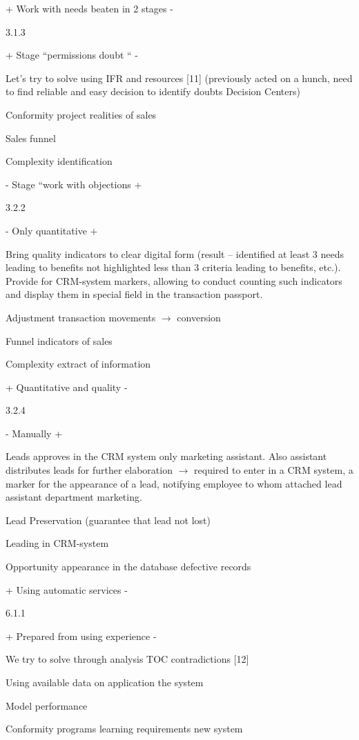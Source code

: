 \documentclass[11pt,a4paper]{book}
\begin{document}
+ Work with needs beaten in 2 stages -

3.1.3

+ Stage “permissions doubt “ -

Let's try to solve using IFR and resources [11] (previously acted on a hunch,
need to find reliable and easy decision to identify doubts Decision Centers)

Conformity project realities of sales

Sales funnel

Complexity identification

- Stage “work with objections +

3.2.2

- Only quantitative +

Bring quality indicators to clear digital form (result -- identified at least
3 needs leading to benefits not highlighted less than 3 criteria leading to
benefits, etc.). Provide for CRM-system markers, allowing to conduct counting
such indicators and display them in special field in the transaction passport.

Adjustment transaction movements $\to$ conversion

Funnel indicators of sales

Complexity extract of information

+ Quantitative and quality -

3.2.4

- Manually +

Leads approves in the CRM system only marketing assistant. Also assistant
distributes leads for further elaboration $\to$ required to enter in a CRM
system, a marker for the appearance of a lead, notifying employee to whom
attached lead assistant department marketing.

Lead Preservation (guarantee that lead not lost)

Leading in CRM-system

Opportunity appearance in the database defective records

+ Using automatic services -

6.1.1

+ Prepared from using experience -

We try to solve through analysis TOC contradictions [12]

Using available data on application the system

Model performance

Conformity programs learning requirements new system
\end{document}
